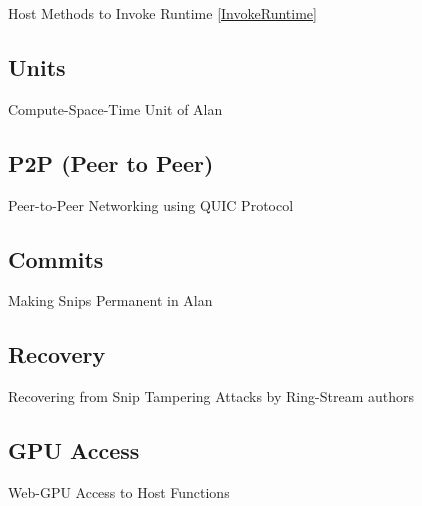 \documentclass[../alan-handbook.tex]{subfiles}
\begin{document}
Host Methods to Invoke Runtime \ref{InvokeRuntime}

\subsection{Units} \label{Units}

Compute-Space-Time Unit of Alan

\subsection{P2P (Peer to Peer)} \label{P2P}

Peer-to-Peer Networking using QUIC Protocol

\subsection{Commits} \label{Commits}

Making Snips Permanent in Alan

\subsection{Recovery} \label{Recovery}

Recovering from Snip Tampering Attacks by Ring-Stream authors

\subsection{GPU Access} \label{HostGPU}

Web-GPU Access to Host Functions
\end{document}
